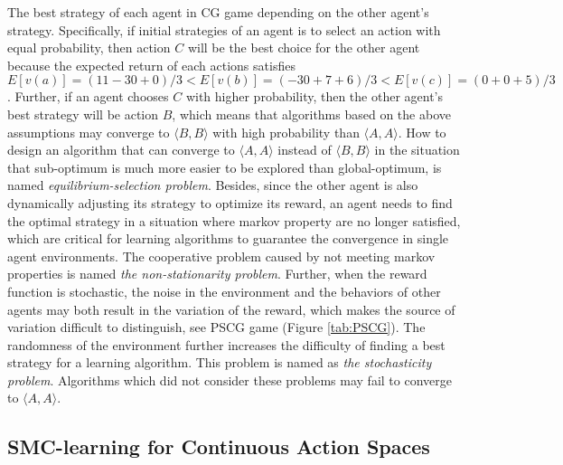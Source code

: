 \documentclass[journal,transmag]{IEEEtran}
\begin{document}
The best strategy of each agent in CG game depending on the other agent's strategy. Specifically, if initial strategies of an agent is to select an action with equal probability, then action $C$ will be the best choice for the other agent because the expected return of each actions satisfies $E[v(a)]=(11-30+0)/3<E[v(b)]=(-30+7+6)/3<E[v(c)]=(0+0+5)/3$. Further, if an agent chooses $C$ with higher probability, then the other agent's best strategy will be action $B$, which means that algorithms based on the above assumptions may converge to $\langle B,B\rangle$ with high probability than $\langle A,A\rangle$. How to design an algorithm that can converge to $\langle A,A\rangle$ instead of $\langle B,B\rangle$ in the situation that sub-optimum is much more easier to be explored than global-optimum, is named \emph{equilibrium-selection problem}. Besides, since the other agent is also dynamically adjusting its strategy to optimize its reward, an agent needs to find the optimal strategy in a situation where markov property are no longer satisfied, which are critical for learning algorithms to guarantee the convergence in single agent environments. The cooperative problem caused by not meeting markov properties is named \emph{the non-stationarity problem}. Further, when the reward function is stochastic, the noise in the environment and the behaviors of other agents may both result in the variation of the reward, which makes the source of variation difficult to distinguish, see PSCG game (Figure \ref{tab:PSCG}). The randomness of the environment further increases the difficulty of finding a best strategy for a learning algorithm. This problem is named as \emph{the stochasticity problem}. Algorithms which did not consider these problems may fail to converge to $\langle A,A\rangle$.



\subsection{SMC-learning for Continuous Action Spaces}
\label{subsection2.2}
\end{document}
